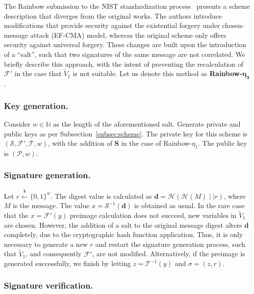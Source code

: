 \documentclass[draft, 12pt, a4paper, oneside]{memoir}
\newcommand{\random}{\stackrel{\$}{\longleftarrow}}
\theoremstyle{definition}
\theoremstyle{remark}
\begin{document}
The Rainbow submission to the NIST standardization
process~\cite{Ding:201712} presents a scheme description that diverges
from the original works. The authors introduce modifications that provide
security against the existential forgery under chosen-message attack (EF-CMA)
model, whereas the original scheme only offers security against universal
forgery. These changes are built upon the introduction of a ``salt'', such that two signatures of the same message are not correlated. We
briefly describe this approach, with the intent of preventing the
recalculation of $\mathcal{F}'$ in the case that $\widetilde{V}_{1}$ is not
suitable. Let us denote this method as \textbf{Rainbow-}$\mathbf{\eta_{3}}$.

\subsubsection{Key generation.}

Consider $w \in \mathbb{N}$ as the length of the aforementioned salt. Generate
private and public keys as per Subsection~\ref{subsec:scheme}. The private key
for this scheme is $(\mathcal{S}, \mathcal{F}', \mathcal{T}, w)$, with the
addition of $\mathbf{S}$ in the case of Rainbow-$\eta_{1}$. The public key is
$(\mathcal{P}, w)$.

\subsubsection{Signature generation.}

Let $r \random{} {\{0, 1\}}^{w}$. The digest value is calculated as
$\mathbf{d} = \mathcal{H}(\mathcal{H}(M) \mid\mid r)$, where $M$ is the
message. The value $x = \mathcal{S}^{-1}(\mathbf{d})$ is obtained as usual. In
the rare case that the $x = \mathcal{F}'(y)$ preimage calculation does not
succeed, new variables in $\widetilde{V}_{1}$ are chosen. However, the
addition of a salt to the original message digest alters $\mathbf{d}$
completely, due to the cryptographic hash function application. Thus, it is
only necessary to generate a new $r$ and restart the signature generation
process, such that $\widetilde{V}_{1}$, and consequently $\mathcal{F}'$, are
not modified. Alternatively, if the preimage is generated successfully, we
finish by letting $z = \mathcal{T}^{-1}(y)$ and $\sigma = (z, r)$.

\subsubsection{Signature verification.}
\end{document}

